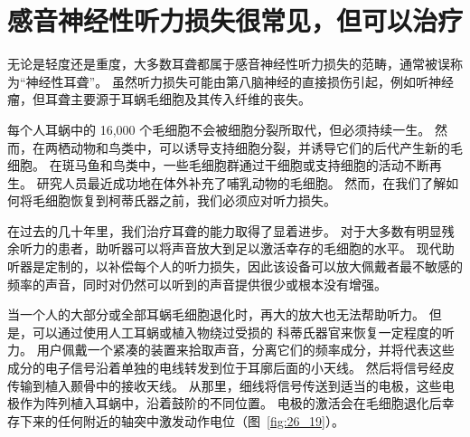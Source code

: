 \section{感音神经性听力损失很常见，但可以治疗}

无论是轻度还是重度，大多数耳聋都属于感音神经性听力损失的范畴，通常被误称为“神经性耳聋”。
虽然听力损失可能由第八脑神经的直接损伤引起，例如听神经瘤，但耳聋主要源于耳蜗毛细胞及其传入纤维的丧失。


每个人耳蜗中的 16,000 个毛细胞不会被细胞分裂所取代，但必须持续一生。
然而，在两栖动物和鸟类中，可以诱导支持细胞分裂，并诱导它们的后代产生新的毛细胞。
在斑马鱼和鸟类中，一些毛细胞群通过干细胞或支持细胞的活动不断再生。
研究人员最近成功地在体外补充了哺乳动物的毛细胞。 然而，在我们了解如何将毛细胞恢复到柯蒂氏器之前，我们必须应对听力损失。


在过去的几十年里，我们治疗耳聋的能力取得了显着进步。
对于大多数有明显残余听力的患者，助听器可以将声音放大到足以激活幸存的毛细胞的水平。
现代助听器是定制的，以补偿每个人的听力损失，因此该设备可以放大佩戴者最不敏感的频率的声音，同时对仍然可以听到的声音提供很少或根本没有增强。


当一个人的大部分或全部耳蜗毛细胞退化时，再大的放大也无法帮助听力。
但是，可以通过使用人工耳蜗或植入物绕过受损的 科蒂氏器官来恢复一定程度的听力。
用户佩戴一个紧凑的装置来拾取声音，分离它们的频率成分，并将代表这些成分的电子信号沿着单独的电线转发到位于耳廓后面的小天线。
然后将信号经皮传输到植入颞骨中的接收天线。
从那里，细线将信号传送到适当的电极，这些电极作为阵列植入耳蜗中，沿着鼓阶的不同位置。
电极的激活会在毛细胞退化后幸存下来的任何附近的轴突中激发动作电位（图~\ref{fig:26_19}）。


